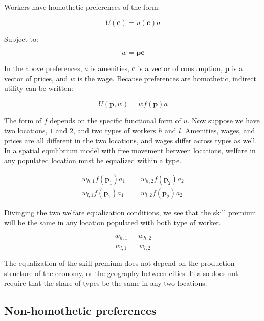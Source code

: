 \documentclass{article}
\begin{document}
Workers have homothetic preferences of the form:

\begin{equation}
    U(\bm{c}) = u(\bm{c}) a \nonumber
    \label{eq:homo}
\end{equation}

Subject to:

\begin{equation}
    w = \bm{p} \bm{c}  \nonumber
    \label{eq:homobc}
\end{equation}

In the above preferences, $a$ is amenities, $\bm{c}$ is a vector of consumption, $\bm{p}$ is a vector of prices, and $w$ is the wage.  Because preferences are homothetic, indirect utility can be written: 

\begin{equation}
    U(\bm{p},w) = w f(\bm{p}) a \nonumber
    \label{eq:homoin}
\end{equation}

The form of $f$ depends on the specific functional form of $u$.  Now suppose we have two locations, $1$ and $2$, and two types of workers $h$ and $l$.  Amenities, wages, and prices are all different in the two locations, and wages differ across types as well.  In a spatial equilibrium model with free movement between locations, welfare in any populated location must be equalized within a type.

\begin{align}
    w_{h,1} f(\bm{p}_{1}) a_{1} &= w_{h,2} f(\bm{p}_{2}) a_{2} \nonumber \\
    w_{l,1} f(\bm{p}_{1}) a_{1} &= w_{l,2} f(\bm{p}_{2}) a_{2} \nonumber
\end{align}

Divinging the two welfare equalization conditions, we see that the skill premium will be the same in any location populated with both type of worker.

\begin{equation}
    \frac{w_{h,1}}{w_{l,1}} = \frac{w_{h,2}}{w_{l,2}} \nonumber
\end{equation}

The equalization of the skill premium does not depend on the production structure of the economy, or the geography between cities.  It also does not require that the share of types be the same in any two locations.

\subsection{Non-homothetic preferences}
\end{document}
